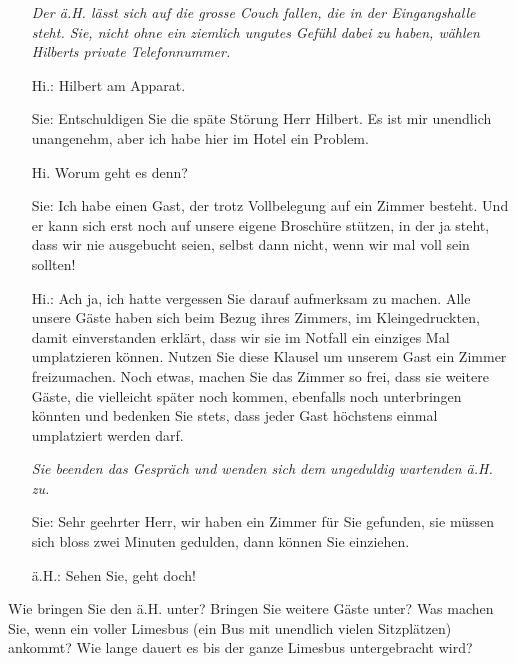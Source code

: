 \begin{bsp}
\begin{itemize}
\textit{Der ä.H. lässt sich auf die grosse Couch fallen, die in der Eingangshalle steht. Sie, nicht ohne ein ziemlich ungutes Gefühl dabei zu haben, wählen Hilberts private Telefonnummer.}
\item[Hi.:] Hilbert am Apparat.
\item[Sie:] Entschuldigen Sie die späte Störung Herr Hilbert. Es ist mir unendlich unangenehm, aber ich habe hier im Hotel ein Problem.
\item[Hi.] Worum geht es denn?
\item[Sie:] Ich habe einen Gast, der trotz Vollbelegung auf ein Zimmer besteht. Und er kann sich erst noch auf unsere eigene Broschüre stützen, in der ja steht, dass wir nie ausgebucht seien, selbst dann nicht, wenn wir mal voll sein sollten!
\item[Hi.:] Ach ja, ich hatte vergessen Sie darauf aufmerksam zu machen. Alle unsere Gäste haben sich beim Bezug ihres Zimmers, {\tiny im Kleingedruckten}, damit einverstanden erklärt, dass wir sie im Notfall ein einziges Mal umplatzieren können. Nutzen Sie diese Klausel um unserem Gast ein Zimmer freizumachen. Noch etwas, machen Sie das Zimmer so frei, dass sie weitere Gäste, die vielleicht später noch kommen, ebenfalls noch unterbringen könnten und bedenken Sie stets, dass jeder Gast höchstens einmal umplatziert werden darf.

\textit{Sie beenden das Gespräch und wenden sich dem ungeduldig wartenden ä.H. zu.}
\item[Sie:] Sehr geehrter Herr, wir haben ein Zimmer für Sie gefunden, sie müssen sich bloss zwei Minuten gedulden, dann können Sie einziehen.
\item[ä.H.:] Sehen Sie, geht doch!
\end{itemize}
Wie bringen Sie den ä.H. unter? Bringen Sie weitere Gäste unter? Was machen Sie, wenn ein voller Limesbus (ein Bus mit unendlich vielen Sitzplätzen) ankommt? Wie lange dauert es bis der ganze Limesbus untergebracht wird?
\end{bsp}

